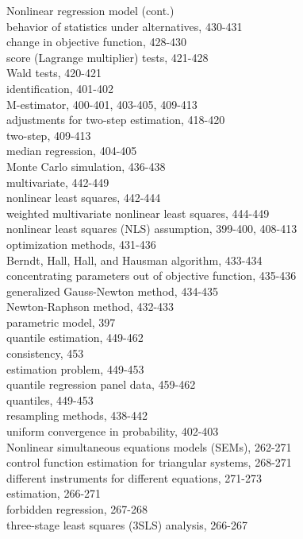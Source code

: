\documentclass[10pt]{article}
\begin{document}
Nonlinear regression model (cont.)\\
behavior of statistics under alternatives, 430-431\\
change in objective function, 428-430\\
score (Lagrange multiplier) tests, 421-428\\
Wald tests, 420-421\\
identification, 401-402\\
M-estimator, 400-401, 403-405, 409-413\\
adjustments for two-step estimation, 418-420\\
two-step, 409-413\\
median regression, 404-405\\
Monte Carlo simulation, 436-438\\
multivariate, 442-449\\
nonlinear least squares, 442-444\\
weighted multivariate nonlinear least squares, 444-449\\
nonlinear least squares (NLS) assumption, 399-400, 408-413\\
optimization methods, 431-436\\
Berndt, Hall, Hall, and Hausman algorithm, 433-434\\
concentrating parameters out of objective function, 435-436\\
generalized Gauss-Newton method, 434-435\\
Newton-Raphson method, 432-433\\
parametric model, 397\\
quantile estimation, 449-462\\
consistency, 453\\
estimation problem, 449-453\\
quantile regression panel data, 459-462\\
quantiles, 449-453\\
resampling methods, 438-442\\
uniform convergence in probability, 402-403\\
Nonlinear simultaneous equations models (SEMs), 262-271\\
control function estimation for triangular systems, 268-271\\
different instruments for different equations, 271-273\\
estimation, 266-271\\
forbidden regression, 267-268\\
three-stage least squares (3SLS) analysis, 266-267\\
\end{document}

